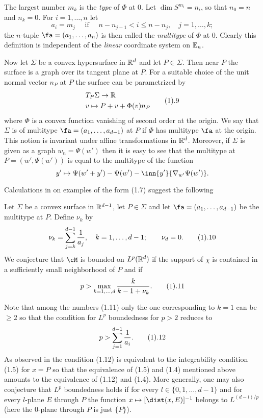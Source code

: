 The largest number $m_k$ is  the {\it type } of $\Phi$ at $0$.
Let $\dim S^{m_i}=n_i$, so that $n_0=n$ and $n_{k}= 0$.
For $i=1,\dots, n$ let
$$a_i=m_j\quad\text{ if }\quad
n-n_{j-1}<i\le n-n_j, \quad j=1,\dots,k;
$$
the  $n$-tuple $\fa=(a_1,\dots, a_n)$ is then called the {\it multitype}
of $\Phi$ at $0$. 
Clearly this definition is independent of  the {\it linear}
 coordinate system on $\Bbb E_n$.



Now let $\Sigma$ be a convex hypersurface in $\Bbb R^d$ and let $P\in \Sigma$.
Then near $P$ the surface is a graph over its tangent plane at $P$.
For a suitable choice of the 
 unit  normal vector $n_P$ at $P$ the surface can be parametrized
by
$$
\aligned
&T_P\Sigma\to \Bbb R
\\
&v\mapsto P+v+ \Phi(v) n_P
\endaligned
\tag 1.9
$$
where $\Phi$ is a convex function  vanishing of second order at the origin.
We say that $\Sigma$ is of multitype $\fa=(a_1,\dots, a_{d-1})$ at $P$
if $\Phi$
has multitype $\fa$ at the origin. This notion is invariant under
affine transformations in $\Bbb R^d$. Moreover, if $\Sigma$ is given as 
a graph $w_n=\Psi(w')$ then it is easy to see that
the multitype at $P=(w',\Psi(w'))$  is equal to the multitype of the function
$$y'\mapsto \Psi(w'+y')-\Psi(w')-\inn{y'}{\nabla_{w'}\Psi(w')}.$$



Calculations in \cite{18} on examples of the form (1.7)
suggest the following

 Let $\Sigma$ be a convex surface in $\Bbb R^{d-1}$,
 let
$P\in \Sigma$ and let $\fa=(a_1,\dots, a_{d-1})$ be the multitype at $P$.
 Define $\nu_k$ by
$$
\nu_k=\sum_{j=k}^{d-1}\frac 1{a_j},\quad k=1,\dots,d-1; \qquad \nu_d=0.
\tag 1.10
$$ 
We conjecture that
$\cM$ is bounded on $L^p(\Bbb R^d)$ if the support of $\chi$ 
is contained in a sufficiently small neighborhood of $P$ and 
if
$$p>\max_{k=1,\dots,d} \frac{k}{k-1+\nu_k}.
\tag 1.11$$


Note that among the numbers (1.11) only the one corresponding to
$k=1$ can be  $\ge 2$ so that the condition for 
$L^p$ boundedness for $p>2$ reduces to  
$$p>\sum_{j=1}^{d-1}\frac 1{a_i}.\tag 1.12$$
As observed in \cite{14}
the condition (1.12) is equivalent to the integrability condition
(1.5) for $x=P$ so that the equivalence of (1.5) and (1.4)
mentioned above amounts to the equivalence of (1.12) and (1.4).
More generally,   one may also  conjecture that $L^p$ boundedness holds
if for every $l\in\{0,1,\dots, d-1\}$ and for every $l$-plane $E$ through
$P$ the function $x\mapsto [\dist (x,E)]^{-1}$ belongs to $L^{(d-l)/p}$
(here the $0$-plane through $P$ is just $\{P\}$). 

